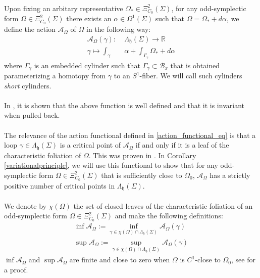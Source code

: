 \documentclass[11pt]{amsart}
\theoremstyle{plain}
\theoremstyle{definition}
\theoremstyle{remark}
\begin{document}
\\
Upon fixing an arbitary representative $\Omega_* \in \Xi^2_{C_0}(\Sigma)$, for any odd-symplectic form $\Omega \in \Xi^2_{C_0}(\Sigma)$ there exists an $\alpha \in \Omega^1(\Sigma)$ such that $\Omega = \Omega_*+d\alpha$, we define the action $\mathcal{A}_{\Omega}$ of $\Omega$ in the following way:
\begin{align}\label{action_functional_eq}
    \mathcal{A}_{\Omega}(\gamma):\;&{\Lambda}_{\mathfrak{h}}(\Sigma) \rightarrow \mathbb{R}\\\nonumber \gamma \mapsto \int_{\gamma}&\alpha + \int_{\Gamma_{\gamma}} \Omega_*+d\alpha
\end{align}
where $\Gamma_{\gamma}$ is an embedded cylinder such that $\Gamma_{\gamma} \subset \mathcal{B}_x$ that is obtained parameterizing a homotopy from $\gamma$ to an $S^1$-fiber. We will call such cylinders \emph{short} cylinders.\\
\\
In \cite{B-K-Odd_Symp}, it is shown that the above function is well defined and that it is invariant when pulled back.\\
\\
The relevance of the action functional defined in \eqref{action_functional_eq} is that a loop $\gamma \in  {\Lambda}_{\mathfrak{h}}(\Sigma)$ is a critical point of $\mathcal{A}_{\Omega}$ if and only if it is a leaf of the characteristic foliation of $\Omega$. This was proven in \cite[Corollary 6.5]{B-K-Odd_Symp}. In Corollary \ref{variationalprinciple}, we will use this functional to show that for any odd-symplectic form $\Omega \in \Xi^2_{C_0}(\Sigma)$ that is sufficiently close to $\Omega_0$, $\mathcal{A}_{\Omega}$ has a strictly positive number of critical points in $\Lambda_{\mathfrak{h}}(\Sigma)$.\\
\\
We denote by $\chi(\Omega)$ the set of closed leaves of the characteristic foliation of an odd-symplectic form $\Omega \in \Xi^2_{C_0}(\Sigma)$ and make the following definitions:
\begin{align}
    \inf \mathcal{A}_{\Omega}:= \inf_{\gamma \in \chi(\Omega) \cap \Lambda_{\mathfrak{h}}(\Sigma)}
\mathcal{A}_{\Omega}(\gamma)  \\\nonumber \sup \mathcal{A}_{\Omega}:= \sup_{\gamma \in \chi(\Omega)\cap \Lambda_{\mathfrak{h}}(\Sigma)} \mathcal{A}_{\Omega}(\gamma)
\end{align}
$\inf \mathcal{A}_{\Omega}$ and $\sup \mathcal{A}_{\Omega} $ are finite and close to zero when $\Omega$ is $C^1$-close to $\Omega_0$, see \cite{B-K-Odd_Symp} for a proof.
\end{document}
